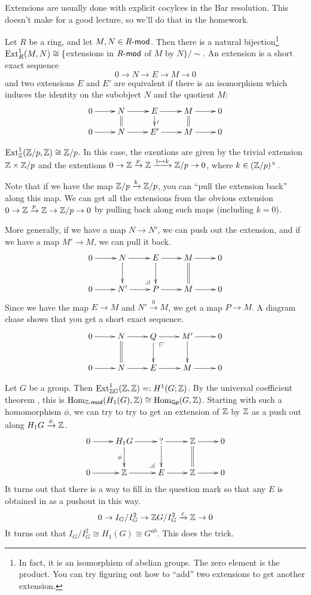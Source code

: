 
Extensions are usually done with explicit cocylces in the Bar resolution. This doesn't make for a good lecture, so we'll do that in the homework.

\begin{theorem}
 Let $R$ be a ring, and let $M,N\in R\mod$. Then there is a natural bijection\footnote{In fact, it is an isomorphism of abelian groups. The zero element is the product. You can try figuring out how to ``add'' two extensions to get another extension.} $\ext^1_R(M,N)\cong \{$extensions in $R\mod$ of $M$ by $N\}/\sim$. An extension is a short exact sequence
 \[
  0\to N\to E\to M\to 0
 \]
 and two extensions $E$ and $E'$ are equivalent if there is an isomorphism which induces the identity on the subobject $N$ and the quotient $M$:
 \[\xymatrix@R-1pc{
  0\ar[r] & N\ar@{=}[d] \ar[r] & E\ar[d]^\wr \ar[r] & M\ar[r] \ar@{=}[d] & 0\\
  0\ar[r] & N\ar[r] & E'\ar[r] & M\ar[r] & 0
 }\]
\end{theorem}
\begin{example}
 $\ext^1_\ZZ(\ZZ/p,\ZZ)\cong \ZZ/p$. In this case, the exentions are given by the trivial extension $\ZZ\times \ZZ/p$ and the extentions $0\to \ZZ\xrightarrow p \ZZ \xrightarrow{1\mapsto k} \ZZ/p\to 0$, where $k\in (\ZZ/p)^\times$.
 
 Note that if we have the map $\ZZ/p\xrightarrow k\ZZ/p$, you can ``pull the extension back'' along this map. We can get all the extensions from the obvious extension $0\to \ZZ\xrightarrow p \ZZ\to \ZZ/p\to 0$ by pulling back along such maps (including $k=0$).
\end{example}
More generally, if we have a map $N\to N'$, we can push out the extension, and if we have a map $M'\to M$, we can pull it back.
\[\xymatrix{
 0\ar[r] & N\ar[d] \ar[r] & E\ar[d] \ar[r] & M\ar[r] \ar@{=}[d] & 0\\
 0\ar[r] & N'\ar[r] & P\ar[r]\ar@{}[ul]|(.25)\po & M\ar[r] & 0
}\]
Since we have the map $E\to M$ and $N'\xrightarrow 0 M$, we get a map $P\to M$. A diagram chase shows that you get a short exact sequence.
\[\xymatrix{
 0\ar[r] & N\ar@{=}[d] \ar[r] & Q\ar[d] \ar[r] \ar@{}[dr]|(.25)\pb & M'\ar[r] \ar[d] & 0\\
 0\ar[r] & N\ar[r] & E\ar[r] & M\ar[r] & 0
}\]
\begin{example}
 Let $G$ be a group. Then $\ext^1_{\ZZ G}(\ZZ,\ZZ)=: H^1(G;\ZZ)$. By the universal coefficient theorem , this is $\hom_{\ZZ\mod}(H_1(G),\ZZ)\cong \hom_\gp(G,\ZZ)$. Starting with such a homomorphism $\phi$, we can try to try to get an extension of $\ZZ$ by $\ZZ$ as a push out along $H_1 G\xrightarrow \phi \ZZ$.
 \[\xymatrix{
  0\ar[r] & H_1 G\ar[d]_\phi \ar[r] & ? \ar[r] \ar[d] & \ZZ\ar[r]\ar@{=}[d] & 0\\
  0\ar[r] & \ZZ \ar[r] & E\ar@{}[ul]|(.25)\po \ar[r] & \ZZ\ar[r] & 0
 }\]
 It turns out that there is a way to fill in the question mark so that any $E$ is obtained in as a pushout in this way.
 \[
  0\to I_G/I_G^2 \to \ZZ G/I_G^2 \xrightarrow \e \ZZ\to 0
 \]
 It turns out that $I_G/I_G^2\cong H_1(G)\cong G^{ab}$. This does the trick. 
\end{example}

